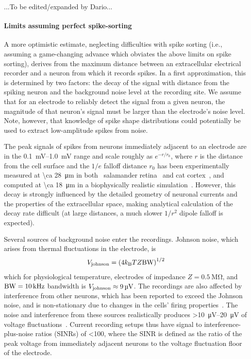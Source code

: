 ...To be edited/expanded by Dario...

\paragraph{Limits assuming perfect spike-sorting}
A more optimistic estimate, neglecting difficulties with spike sorting (i.e., assuming a game-changing advance which obviates the above limits on spike sorting), derives from the maximum distance between an extracellular electrical recorder and a neuron from which it records spikes.
In a first approximation, this is determined by two factors: the decay of the signal with distance from the spiking neuron and the background noise level at the recording site.
We assume that for an electrode to reliably detect the signal from a given neuron, the magnitude of that neuron's signal must be larger than the electrode's noise level. Note, however, that knowledge of spike shape distributions could potentially be used to extract low-amplitude spikes from noise.

The peak signals of spikes from neurons immediately adjacent to an electrode are in the \SIrange{0.1}{1.0}{\milli\volt} range and scale roughly as $e^{-r/r_0}$, where $r$ is the distance from the cell surface and the $1/e$ falloff distance $r_0$ has been experimentally measured at \SI{\ca 28}{\micro\meter} in both~\cite{Shoham2006} salamander retina~\cite{segev04} and cat cortex~\cite{gray95}, and computed at \SI{\ca 18}{\micro\meter} in a biophysically realistic simulation~\cite{gold07}.
However, this decay is strongly influenced by the detailed geometry of neuronal currents and the properties of the extracellular space, making analytical calculation of the decay rate difficult (at large distances, a much slower $1/r^2$ dipole falloff is expected).

Several sources of background noise enter the recordings.
Johnson noise, which arises from thermal fluctuations in the electrode, is \[V_{\text{\scriptsize johnson}} = \left(4k_{\text{\scriptsize B}} T Z \text{BW}\right)^{1/2}\]
which for physiological temperature, electrodes of impedance $Z = \SI{0.5}{\mega\ohm}$, and $\text{BW} = \SI{10}{\kilo\hertz}$ bandwidth is $V_{\text{\scriptsize johnson}} \approx \SI{9}{\micro\volt}$.
The recordings are also affected by interference from other neurons, which has been reported to exceed the Johnson noise, and is non-stationary due to changes in the cells' firing properties~\cite{sahani99}. 
The noise and interference from these sources realistically produces \SIrange{>10}{20}{\micro\volt} of voltage fluctuations~\cite{camunas13}.
Current recording setups thus have signal to interference-plus-noise ratios (SINRs) of \num{<100}, where the SINR is defined as the ratio of the peak voltage from immediately adjacent neurons to the voltage fluctuation floor of the electrode.

